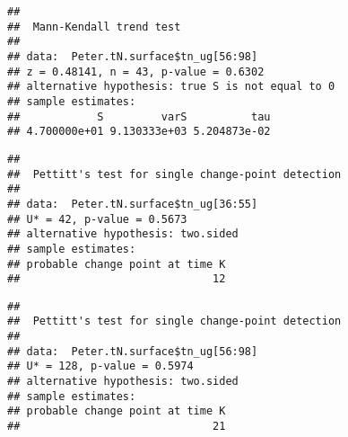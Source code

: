 \documentclass[]{article}
\newenvironment{Shaded}{\begin{snugshade}}{\end{snugshade}}
\newcommand{\KeywordTok}[1]{\textcolor[rgb]{0.13,0.29,0.53}{\textbf{#1}}}
\newcommand{\DecValTok}[1]{\textcolor[rgb]{0.00,0.00,0.81}{#1}}
\newcommand{\CommentTok}[1]{\textcolor[rgb]{0.56,0.35,0.01}{\textit{#1}}}
\newcommand{\OperatorTok}[1]{\textcolor[rgb]{0.81,0.36,0.00}{\textbf{#1}}}
\newcommand{\NormalTok}[1]{#1}
\begin{document}
\begin{verbatim}
## 
##  Mann-Kendall trend test
## 
## data:  Peter.tN.surface$tn_ug[56:98]
## z = 0.48141, n = 43, p-value = 0.6302
## alternative hypothesis: true S is not equal to 0
## sample estimates:
##            S         varS          tau 
## 4.700000e+01 9.130333e+03 5.204873e-02
\end{verbatim}

\begin{Shaded}
\end{Shaded}

\begin{verbatim}
## 
##  Pettitt's test for single change-point detection
## 
## data:  Peter.tN.surface$tn_ug[36:55]
## U* = 42, p-value = 0.5673
## alternative hypothesis: two.sided
## sample estimates:
## probable change point at time K 
##                              12
\end{verbatim}

\begin{Shaded}
\end{Shaded}

\begin{verbatim}
## 
##  Pettitt's test for single change-point detection
## 
## data:  Peter.tN.surface$tn_ug[56:98]
## U* = 128, p-value = 0.5974
## alternative hypothesis: two.sided
## sample estimates:
## probable change point at time K 
##                              21
\end{verbatim}
\end{document}

